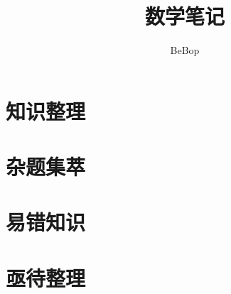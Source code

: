 \documentclass[12pt,a4paper]{book}
\begin{document}
    \title{数学笔记}
    \author{BeBop}
    \maketitle
    \newpage

    \tableofcontents
    \newpage
    
    \part{知识整理}


    \part{杂题集萃}

    \part{易错知识} %

    \part{亟待整理} %
    
\end{document}
